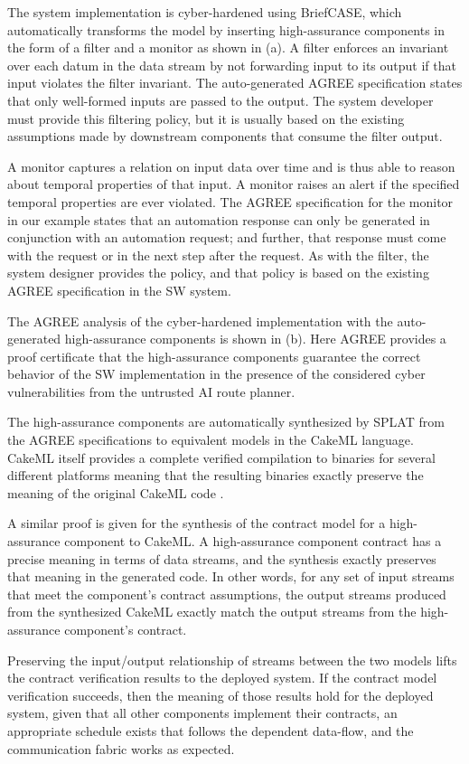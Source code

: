 The system implementation is cyber-hardened using BriefCASE, which automatically transforms the model by inserting high-assurance components in the form of a filter and a monitor as shown in (a). A filter enforces an invariant over each datum in the data stream by not forwarding input to its output if that input violates the filter invariant. The auto-generated AGREE specification states that only well-formed inputs are passed to the output. The system developer must provide this filtering policy, but it is usually based on the existing assumptions made by downstream components that consume the filter output. 

A monitor captures a relation on input data over time and is thus able to reason about temporal properties of that input. A monitor raises an alert if the specified temporal properties are ever violated. The AGREE specification for the monitor in our example states that an automation response can only be generated in conjunction with an automation request; and further, that response must come with the request or in the next step after the request. As with the filter, the system designer provides the policy, and that policy is based on the existing AGREE specification in the SW system.

The AGREE analysis of the cyber-hardened implementation with the auto-generated high-assurance components is shown in (b). Here AGREE provides a proof certificate that the high-assurance components guarantee the correct behavior of the SW implementation in the presence of the considered cyber vulnerabilities from the untrusted AI route planner.

The high-assurance components are automatically synthesized by SPLAT from the AGREE specifications to equivalent models in the CakeML language. CakeML itself provides a complete verified compilation to binaries for several different platforms meaning that the resulting binaries exactly preserve the meaning of the original CakeML code \cite{cakeml}. 

A similar proof is given for the synthesis of the contract model for a high-assurance component to CakeML. A high-assurance component contract has a precise meaning in terms of data streams, and the synthesis exactly preserves that meaning in the generated code. In other words, for any set of input streams that meet the component's contract assumptions, the output streams produced from the synthesized CakeML exactly match the output streams from the high-assurance component's contract. 

Preserving the input/output relationship of streams between the two models lifts the contract verification results to the deployed system. If the contract model verification succeeds, then the meaning of those results hold for the deployed system, given that all other components implement their contracts, an appropriate schedule exists that follows the dependent data-flow, and the communication fabric works as expected.